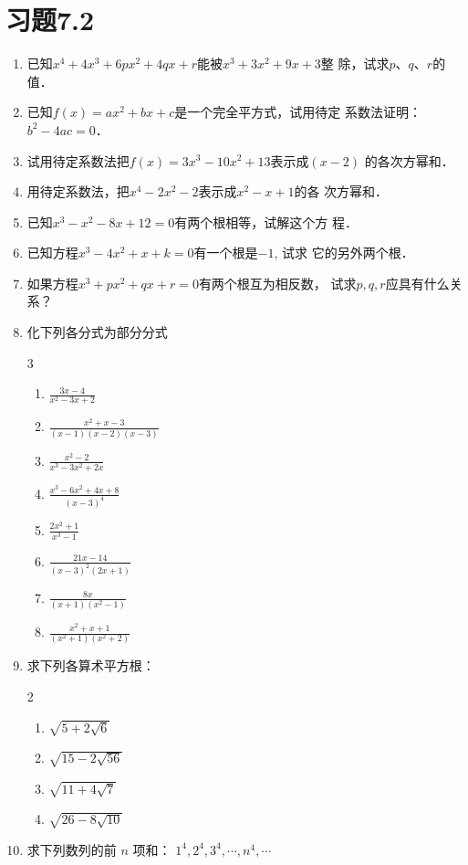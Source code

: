 \section*{习题7.2}
\begin{enumerate}
    \item 已知$x^4+4x^3+6px^2+4qx+r$能被$x^3+3x^2+9x+3$整
    除，试求$p$、$q$、$r$的值．
    \item 已知$f(x)=ax^2+bx+c$是一个完全平方式，试用待定
    系数法证明：$b^2-4ac=0$．
    \item 试用待定系数法把$f(x)=3x^3-10x^2+13$表示成$(x-2)$
    的各次方幂和．
    \item 用待定系数法，把$x^4-2x^2-2$表示成$x^2-x+1$的各
    次方幂和．
    \item 已知$x^3-x^2-8x+12=0$有两个根相等，试解这个方
    程．
    \item 已知方程$x^3-4x^2+x+k=0$有一个根是$-1$, 试求
    它的另外两个根．
    \item  如果方程$x^3+px^2+qx+r=0$有两个根互为相反数，
    试求$p,q,r$应具有什么关系？
    \item  化下列各分式为部分分式
    \begin{multicols}{3}
  \begin{enumerate}
\item  $\frac{3 x-4}{x^{2}-3 x+2}$
\item  $\frac{x^{2}+x-3}{(x-1)(x-2)(x-3)}$
\item $\frac{x^{2}-2}{x^{3}-3 x^{2}+2 x}$
\item  $\frac{x^{3}-6 x^{2}+4 x+8}{(x-3)^{4}}$
\item  $\frac{2 x^{2}+1}{x^{3}-1}$
\item  $\frac{21 x-14}{(x-3)^{2}(2 x+1)}$
\item  $\frac{8 x}{(x+1)\left(x^{2}-1\right)}$
\item  $\frac{x^{2}+x+1}{\left(x^{2}+1\right)\left(x^{2}+2\right)}$
\end{enumerate}      
    \end{multicols}

\item 求下列各算术平方根：
\begin{multicols}{2}
   \begin{enumerate}
    \item  $\sqrt{5+2 \sqrt{6}}$
    \item  $\sqrt{15-2 \sqrt{56}}$
    \item  $\sqrt{11+4 \sqrt{7}}$
    \item  $\sqrt{26-8 \sqrt{10}}$  
\end{enumerate}     
\end{multicols}

\item 求下列数列的前 $n$ 项和：
    $1^{4}, 2^{4}, 3^{4}, \cdots , n^{4}, \cdots$

\end{enumerate}






